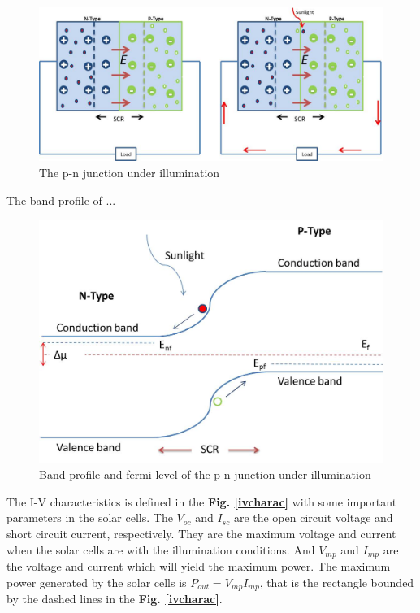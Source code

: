 \documentclass[a4paper, 12pt, titlepage,oneside,drop]{kthesis}
\begin{document}
\begin{figure}[H]
\centering
\includegraphics[scale=0.5]{illumination.jpg}
\caption{The p-n junction under illumination}
\label{illu}
\end{figure}

The band-profile of ...


\begin{figure}[H]
\centering
\includegraphics[scale=0.45]{illumination1.jpg}
\caption{Band profile and fermi level of the p-n junction under illumination}
\label{illu1}
\end{figure}


The I-V characteristics is defined in the \textbf{Fig. \ref{ivcharac}} with some important parameters in the solar cells.
The $V_{oc}$ and $I_{sc}$ are the open circuit voltage and short circuit current, respectively. They are the maximum voltage and current when the solar cells are with the illumination conditions.
And $V_{mp}$ and $I_{mp}$ are the voltage and current which will yield the maximum power. The maximum power generated by the solar cells is $P_{out}=V_{mp} I_{mp}$, that is the rectangle bounded by the dashed lines in the 
\textbf{Fig. \ref{ivcharac}}. 
\end{document}
